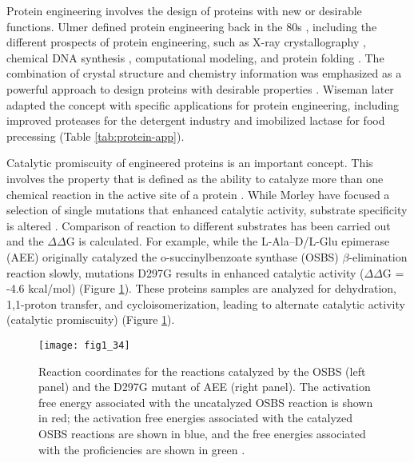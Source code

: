 \begin{refsection}
Protein engineering involves the design of proteins with new or desirable
functions. Ulmer  defined protein engineering back
in the 80s \cite{Ulmer1983}, including the different prospects of
protein engineering, such as X-ray crystallography \cite{Takeda2006}, chemical
DNA synthesis \cite{Pannekoek1979}, computational modeling, and protein folding
\cite{Ulmer1983}. The combination of crystal structure and chemistry
information was emphasized as a powerful approach to design proteins with
desirable properties \cite{Ulmer1983}. Wiseman  later adapted the
concept with specific applications for protein engineering, including improved
proteases for the detergent industry \cite{Wiseman1993,Harwood1992} and
imobilized lactase for food precessing \cite{Wiseman1993} (Table
\ref{tab:protein-app}). 

Catalytic promiscuity of engineered proteins is an important concept. This
involves the property that is defined as the ability to catalyze more than one
chemical reaction in the active site of a protein \cite{Kazlauskas2005a}. While
Morley  have focused a selection of single mutations that enhanced
catalytic activity, substrate specificity is altered \cite{Morley2005a}.
Comparison of reaction to different substrates has been carried out and the
$\Delta$$\Delta$G is calculated. For example, while the L-Ala–D/L-Glu
epimerase (AEE) originally catalyzed the o-succinylbenzoate synthase (OSBS)
$\beta$-elimination reaction slowly, mutations D297G results in enhanced catalytic
activity ($\Delta$$\Delta$G = -4.6 kcal/mol) (Figure
\ref{fig:protein-engineering-example}). These proteins samples are analyzed
for dehydration, 1,1-proton transfer, and cycloisomerization,
leading to alternate catalytic activity (catalytic promiscuity)
\cite{Kazlauskas2005a,Schmidt2003} (Figure
\ref{fig:protein-engineering-example}).
\begin{figure}[htbp] \centering \texttt{[image: fig1\_34]}
    \caption[Reaction coordinates for the reactions catalyzed by the OSBS (left
    panel) and the D297G mutant of AEE (right panel). The activation free
energy associated with the uncatalyzed OSBS reaction is shown in red; the
activation free energies associated with the catalyzed OSBS reactions are shown
in blue, and the free energies associated with the proficiencies are shown in
green.]{Reaction coordinates for the reactions catalyzed by the OSBS (left
    panel) and the D297G mutant of AEE (right panel). The activation free
    energy associated with the uncatalyzed OSBS reaction is shown in red; the
    activation free energies associated with the catalyzed OSBS reactions are
    shown in blue, and the free energies associated with the proficiencies are
    shown in green \cite{Schmidt2003}.}
    \label{fig:protein-engineering-example}
\end{figure}


\end{refsection}
